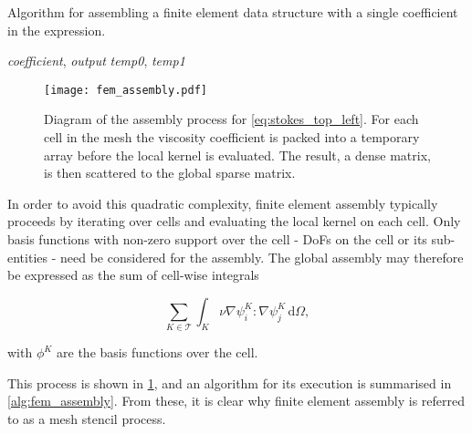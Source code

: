 \documentclass[thesis]{subfiles}
\begin{document}
\begin{algorithm}
  \caption{
    Algorithm for assembling a finite element data structure with a single coefficient in the expression.
  }
  \begin{algorithmic}[1]
    \Require \textit{coefficient}, \textit{output} 
    \Require \textit{temp0}, \textit{temp1} 

      \State {}\label{code:pack_demo}
      \State {}
      \State {} 
      \State {} \label{code:unpack_demo}
    \EndFor
  \end{algorithmic}
  \label{alg:fem_assembly}
\end{algorithm}

\begin{figure}
  \centering
  \texttt{[image: fem\_assembly.pdf]}
  \caption{
    Diagram of the assembly process for \cref{eq:stokes_top_left}.
    For each cell in the mesh the viscosity coefficient is packed into a temporary array before the local kernel is evaluated.
    The result, a dense matrix, is then scattered to the global sparse matrix.
  }
  \label{fig:fem_assembly}
\end{figure}

In order to avoid this quadratic complexity, finite element assembly typically proceeds by iterating over cells and evaluating the local kernel on each cell.
Only basis functions with non-zero support over the cell - DoFs on the cell or its sub-entities - need be considered for the assembly.
The global assembly may therefore be expressed as the sum of cell-wise integrals


\begin{equation}
  \sum_{K \in \mathcal{T}} \int_K \nu \nabla \psi_i^K : \nabla \psi_j^K \, \textrm{d}\Omega,
\end{equation}

\noindent
with $\phi^K$ are the basis functions over the cell.

This process is shown in \cref{fig:fem_assembly}, and an algorithm for its execution is summarised in \cref{alg:fem_assembly}.
From these, it is clear why finite element assembly is referred to as a mesh stencil process.
\end{document}
